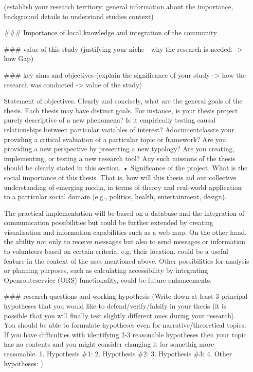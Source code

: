 (establish your research territory: general information about the importance, background details to understand studies context)


\#\#\# Importance of local knowledge and integration of the community

\#\#\# value of this study
(justifying your niche - why the research is needed. -> how Gap)

\#\#\# key aims and objectives
(explain the significance of your study -> how the research was conducted -> value of the study)

Statement of objectives. Clearly and concisely, what are the general goals of the
thesis. Each thesis may have distinct goals. For instance, is your thesis project purely
descriptive of a new phenomena? Is it empirically testing causal relationships
between particular variables of interest? Adocumentclassre your providing a critical evaluation of a
particular topic or framework? Are you providing a new perspective by presenting a
new typology? Are you creating, implementing, or testing a new research tool? Any
such missions of the thesis should be clearly stated in this section.
• Significance of the project. What is the social importance of this thesis. That is, how
will this thesis aid our collective understanding of emerging media, in terms of
theory and real-world application to a particular social domain (e.g., politics, health,
entertainment, design).




The practical implementation will be based on a database and the integration of communication possibilities but could be further extended by creating visualisation and information capabilities such as a web map. On the other hand, the ability not only to receive messages but also to send messages or information to volunteers based on certain criteria, e.g. their location, could be a useful feature in the context of the uses mentioned above. Other possibilities for analysis or planning purposes, such as calculating accessibility by integrating Openrouteservice (ORS) functionality, could be future enhancements.




\#\#\# research questions and working hypothesis
(Write down at least 3 principal hypotheses that you would like to defend/verify/falsify in your thesis (it is possible that you will finally test slightly different ones during your research). You should be able to formulate hypotheses even for narrative/theoretical topics. If you have difficulties with identifying 2-3 reasonable hypotheses then your topic has no contents and you might consider changing it for somethig more reasonable.
1.	Hypothesis \#1:
2.	Hypothesis \#2:
3.	Hypothesis \#3:
4.	Other hypotheses:
)


